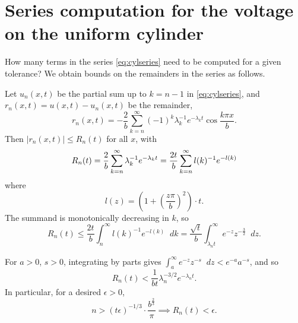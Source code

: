\documentclass[parskip=half]{scrartcl}
\newcommand{\Int}[2]{\int_{#1}^{#2}\!}
\newcommand{\D}{\mathop{}\!d}
\theoremstyle{nonumberplain}
\begin{document}
\newpage
\appendix
\section{Series computation for the voltage on the uniform cylinder}
\label{ap:cylcomp}

How many terms in the series \eqref{eq:cylseries} need to be computed for a given tolerance?
We obtain bounds on the remainders in the series as follows.

Let $u_n(x,t)$ be the partial sum up to $k=n-1$ in \eqref{eq:cylseries}, and $r_n(x,t) = u(x,t) - u_n(x,t)$
be the remainder,
\begin{equation}
    r_n(x,t) = -\frac{2}{b}\sum_{k=n}^{\infty} (-1)^k\lambda_k^{-1}e^{-\lambda_k t}\cos\frac{k\pi x}{b}.
\end{equation}
Then $|r_n(x,t)|\leq R_n(t)$ for all $x$, with
\begin{equation}
    R_n(t) = \frac{2}{b}\sum_{k=n}^{\infty} \lambda_k^{-1}e^{-\lambda_k t}\\
    = \frac{2t}{b}\sum_{k=n}^{\infty} l(k)^{-1}e^{-l(k)}\\
\end{equation}
where
\[
    l(z) = \left(1+\left(\frac{z\pi}{b}\right)^2\right)\cdot t.
\]
The summand is monotonically decreasing in $k$, so
\begin{equation}
    \label{eq:rnigamma}
    R_n(t)
    \leq \frac{2t}{b}\Int{n}{\infty} l(k)^{-1}e^{-l(k)}\D k
    = \frac{\sqrt{t}}{b} \Int{\lambda_n t}{\infty} e^{-z}z^{-\frac{3}{2}} \D z.
\end{equation}

For $a>0$, $s>0$, integrating by parts gives
$\displaystyle \Int{a}{\infty} e^{-z}z^{-s}\D z < e^{-a}a^{-s}$,
and so
\begin{equation}
    R_n(t) < \frac{1}{b t}\lambda_n^{-3/2}e^{-\lambda_n t}.
\end{equation}
In particular, for a desired $\epsilon>0$,
\begin{equation}
    n > (t \epsilon)^{-1/3}\cdot\frac{b^\frac{2}{3}}{\pi}
    \implies
    R_n(t) < \epsilon.
\end{equation}
\end{document}

